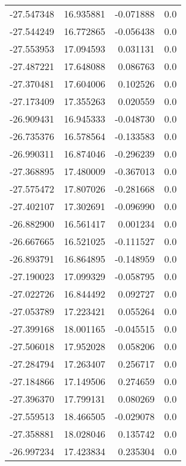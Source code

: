\begin{tabular}{rrrr}
      -27.547348 &        16.935881 &   -0.071888 &   0.0 \\
      -27.544249 &        16.772865 &   -0.056438 &   0.0 \\
      -27.553953 &        17.094593 &    0.031131 &   0.0 \\
      -27.487221 &        17.648088 &    0.086763 &   0.0 \\
      -27.370481 &        17.604006 &    0.102526 &   0.0 \\
      -27.173409 &        17.355263 &    0.020559 &   0.0 \\
      -26.909431 &        16.945333 &   -0.048730 &   0.0 \\
      -26.735376 &        16.578564 &   -0.133583 &   0.0 \\
      -26.990311 &        16.874046 &   -0.296239 &   0.0 \\
      -27.368895 &        17.480009 &   -0.367013 &   0.0 \\
      -27.575472 &        17.807026 &   -0.281668 &   0.0 \\
      -27.402107 &        17.302691 &   -0.096990 &   0.0 \\
      -26.882900 &        16.561417 &    0.001234 &   0.0 \\
      -26.667665 &        16.521025 &   -0.111527 &   0.0 \\
      -26.893791 &        16.864895 &   -0.148959 &   0.0 \\
      -27.190023 &        17.099329 &   -0.058795 &   0.0 \\
      -27.022726 &        16.844492 &    0.092727 &   0.0 \\
      -27.053789 &        17.223421 &    0.055264 &   0.0 \\
      -27.399168 &        18.001165 &   -0.045515 &   0.0 \\
      -27.506018 &        17.952028 &    0.058206 &   0.0 \\
      -27.284794 &        17.263407 &    0.256717 &   0.0 \\
      -27.184866 &        17.149506 &    0.274659 &   0.0 \\
      -27.396370 &        17.799131 &    0.080269 &   0.0 \\
      -27.559513 &        18.466505 &   -0.029078 &   0.0 \\
      -27.358881 &        18.028046 &    0.135742 &   0.0 \\
      -26.997234 &        17.423834 &    0.235304 &   0.0 \\

\end{tabular}
